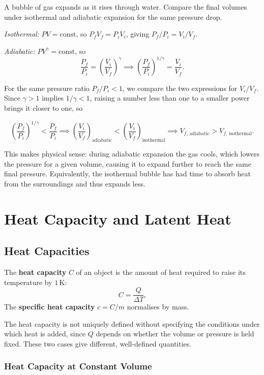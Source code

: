 A bubble of gas expands as it rises through water. Compare the final volumes under isothermal and adiabatic expansion for the same pressure drop.

\textit{Isothermal:} $PV = \text{const}$, so $P_f V_f = P_i V_i$, giving $P_f/P_i = V_i/V_f$.

\textit{Adiabatic:} $PV^\gamma = \text{const}$, so
\[
    \frac{P_f}{P_i} = \left(\frac{V_i}{V_f}\right)^\gamma
    \implies \left(\frac{P_f}{P_i}\right)^{1/\gamma} = \frac{V_i}{V_f}.
\]

For the same pressure ratio $P_f/P_i < 1$, we compare the two expressions for $V_i/V_f$. Since $\gamma > 1$ implies $1/\gamma < 1$, raising a number less than one to a smaller power brings it closer to one, so

\[
    \left(\frac{P_f}{P_i}\right)^{1/\gamma} < \frac{P_f}{P_i}
    \implies \left(\frac{V_i}{V_f}\right)_\text{adiabatic} < \left(\frac{V_i}{V_f}\right)_\text{isothermal}
    \implies \boxed{V_{f,\,\text{adiabatic}} > V_{f,\,\text{isothermal}}}.
\]

This makes physical sense: during adiabatic expansion the gas cools, which lowers the pressure for a given volume, causing it to expand further to reach the same final pressure. Equivalently, the isothermal bubble has had time to absorb heat from the surroundings and thus expands less.

\chapter{Heat Capacity and Latent Heat}

\section{Heat Capacities}

\begin{definition}
The \textbf{heat capacity} $C$ of an object is the amount of heat required to raise its temperature by $1\,\text{K}$:
\[
    C = \frac{Q}{\Delta T}.
\]
The \textbf{specific heat capacity} $c = C/m$ normalises by mass.
\end{definition}

The heat capacity is not uniquely defined without specifying the conditions under which heat is added, since $Q$ depends on whether the volume or pressure is held fixed. These two cases give different, well-defined quantities.

\subsection{Heat Capacity at Constant Volume}

